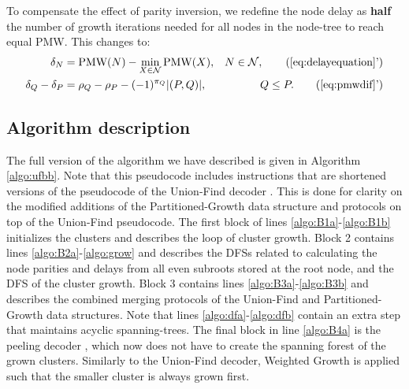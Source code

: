 To compensate the effect of parity inversion, we redefine the node delay as \textbf{half} the number of growth iterations needed for all nodes in the node-tree to reach equal PMW. This changes  to:
\begin{align}
    \delta_N &= \text{PMW}(N) - \min_{X\in\nset}{\text{PMW}(X)}, & N \in \nset, \tag{\ref{eq:delayequation}'}  \\
    \delta_Q - \delta_P &= \rho_Q-\rho_P - (-1)^{\pi_Q}\abs{(P,Q)}, & Q\leq P. \tag{\ref{eq:pmwdif}'}\label{eq:pmwdifnew}
\end{align}

\subsection{Algorithm description}\label{sec:pseudocode}

The full version of the algorithm we have described is given in Algorithm \ref{algo:ufbb}. Note that this pseudocode includes instructions that are shortened versions of the pseudocode of the Union-Find decoder \cite{delfosse2017almost}. This is done for clarity on the modified additions of the Partitioned-Growth data structure and protocols on top of the Union-Find pseudocode. The first block of lines \ref{algo:B1a}-\ref{algo:B1b} initializes the clusters and describes the loop of cluster growth. Block 2 contains lines \ref{algo:B2a}-\ref{algo:grow} and describes the DFSs related to calculating the node parities and delays from all even subroots stored at the root node, and the DFS of the cluster growth. Block 3 contains lines \ref{algo:B3a}-\ref{algo:B3b} and describes the combined merging protocols of the Union-Find and Partitioned-Growth data structures. Note that lines \ref{algo:dfa}-\ref{algo:dfb} contain an extra step that maintains acyclic spanning-trees. The final block in line \ref{algo:B4a} is the peeling decoder \cite{delfosse2017linear}, which now does not have to create the spanning forest of the grown clusters. Similarly to the Union-Find decoder, Weighted Growth is applied such that the smaller cluster is always grown first. 

